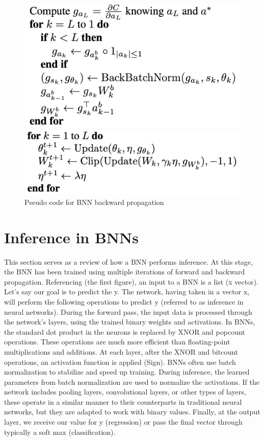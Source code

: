 \begin{figure}
\centerline{\includegraphics[scale = .35]{images/backprop_code.png}}
\centerline{\includegraphics[scale = .50]{images/backprop_2.png}}
\caption{Pseudo code for BNN backward propagation}
\label{fig:backprop2}
\end{figure}

\section{Inference in BNNs}

This section serves as a review of how a BNN performs inference. At this stage, the BNN has been trained using multiple iterations of forward and backward propagation. Referencing (the first figure), an input to a BNN is a list (x vector). Let's say our goal is to predict the y. The network, having taken in a vector x, will perform the following operations to predict y (referred to as inference in neural networks). During the forward pass, the input data is processed through the network's layers, using the trained binary weights and activations. In BNNs, the standard dot product in the neurons is replaced by XNOR and popcount operations. These operations are much more efficient than floating-point multiplications and additions. At each layer, after the XNOR and bitcount operations, an activation function is applied (Sign). BNNs often use batch normalization to stabilize and speed up training. During inference, the learned parameters from batch normalization are used to normalize the activations. If the network includes pooling layers, convolutional layers, or other types of layers, these operate in a similar manner to their counterparts in traditional neural networks, but they are adapted to work with binary values. Finally, at the output layer, we receive our value for y (regression) or pass the final vector through typically a soft max (classification).

